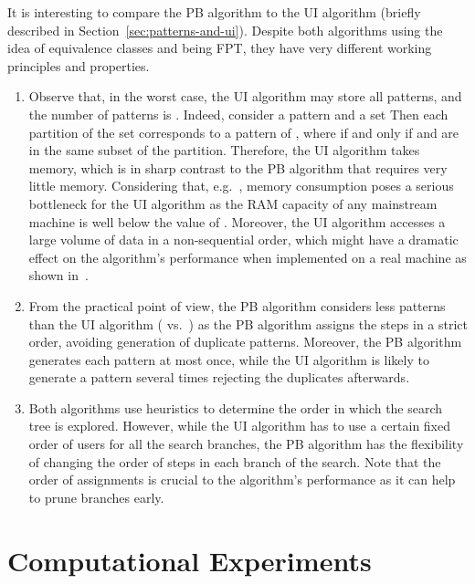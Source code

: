 \documentclass[runningheads,proof]{llncs}
\begin{document}
It is interesting to compare the PB algorithm to the UI algorithm (briefly described in Section~\ref{sec:patterns-and-ui}).
Despite both algorithms using the idea of equivalence classes and being FPT, they have very different working principles and properties.




\begin{enumerate}
	\item Observe that, in the worst case, the UI algorithm may store all patterns, and the number of patterns is . Indeed, consider a pattern  and a set  Then each partition of the set corresponds to a pattern of , where  if and only if  and  are in the same subset of the partition.
	Therefore,  the UI algorithm takes  memory, which is in sharp contrast to the PB algorithm that requires very little memory.
	Considering that, e.g.\ , memory consumption poses a serious bottleneck for the UI algorithm as the RAM capacity of any mainstream machine is well below the 
	value of .
	Moreover, the UI algorithm accesses a large volume of data in a non-sequential order, which might have a dramatic effect on the algorithm's performance when implemented on a real machine as shown in~\cite{KaGuGo}.


	\item From the practical point of view, the PB algorithm considers less
patterns than the UI algorithm ( vs.\ ) as
the PB algorithm assigns the steps in a strict order, avoiding generation of duplicate patterns.  Moreover, the
PB algorithm generates each pattern at most once, while the UI
algorithm is likely to generate a pattern several times rejecting the duplicates afterwards.  


	\item Both algorithms use heuristics to determine the order in which the search tree is explored.
	However, while the UI algorithm has to use a certain fixed order of users for all the search branches, the PB algorithm has the flexibility of changing the order of steps in each branch of the search.
	Note that the order of assignments is crucial to the algorithm's performance as it can help to prune branches early.
\end{enumerate}




\section{Computational Experiments}
\label{sec:experiments}
\end{document}
